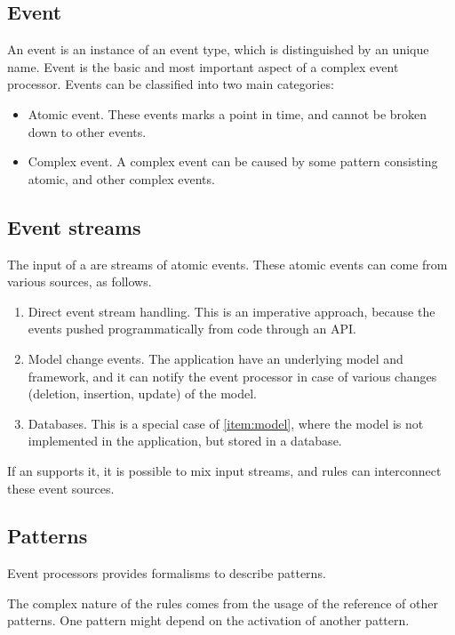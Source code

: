 \subsection{Event}

An event is an instance of an event type, which is distinguished by an unique name.
Event is the basic and most important aspect of a complex event processor. Events can be classified into two main categories:
\begin{itemize}
	\item Atomic event. These events marks a point in time, and cannot be broken down to other events.
	\item Complex event. A complex event can be caused by some pattern consisting atomic, and other complex events.
\end{itemize}

\needspace{10em}
\subsection{Event streams}
\label{subsection:event_streams}
The input of a \cep are streams of atomic events. These atomic events can come from various sources, as follows.
\begin{enumerate}
	\item Direct event stream handling. This is an imperative approach, because the events pushed programmatically from code through an API.

	\item Model change events. The application have an underlying model and framework, and it can notify the event processor in case of various changes (deletion, insertion, update) of the model.\label{item:model}

	\item Databases. This is a special case of \cref{item:model}, where the model is not implemented in the application, but stored in a database.
\end{enumerate}
\vspace{1ex}
If an \cep supports it, it is possible to mix input streams, and rules can interconnect these event sources.

\subsection{Patterns}
Event processors provides formalisms to describe patterns.

The complex nature of the rules comes from the usage of the reference of other patterns. One pattern might depend on the activation of another pattern.

